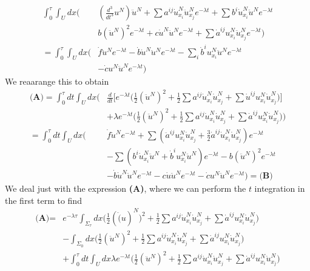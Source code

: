 \documentclass[12pt,a4paper]{report}
\newenvironment{proof}
{\begin{changemargin}{1cm}{0.5cm} 
	}%
	{\end{changemargin}
}
\begin{document}
\begin{proof}
\begin{align*}
\int_0^{\tau}\int_U dx \Big(& (\frac{d^3}{dt^3}u^N)\ddot{u}^N + \sum a^{ij}\dot{u}_{x_i}^N \ddot{u}_{x_j}^N e^{-\lambda t} + \sum b^i \dot{u}_{x_i}^N \ddot{u}^N e^{-\lambda t} \\
& b (\ddot{u}^N)^2 e^{-\lambda t} + c\dot{u}^N \ddot{u}^N e^{-\lambda t} + \sum \dot{a}^{ij}u^N_{x_i}\ddot{u}^N_{x_j} e^{-\lambda t} \Big) \\
=\int_0^{\tau} \int_U dx \Big( &\dot{f}\ddot{u}^N e^{-\lambda t} - \dot{b}\dot{u}^N \ddot{u}^N e^{-\lambda t} - \sum_i \dot{b}^i u_{x_i}^N \ddot{u}^N e^{-\lambda t} \\
& - \dot{c}u^N \ddot{u}^N e^{-\lambda t}\Big)
\end{align*}
We reaarange this to obtain
\begin{align*}
\textbf{(A)} = \int_0^{\tau}dt \int_U dx \Big(& \frac{d}{dt}\Big[ e^{-\lambda t}\Big( \frac{1}{2}(\ddot{u}^N)^2 + \frac{1}{2} \sum a^{ij} \dot{u}_{x_i}^N \dot{u}_{x_j}^N + \sum \dot{u}^{ij}u^N_{x_i}\dot{u}^N_{x_j} \Big) \Big] \\
& + \lambda e^{-\lambda t}\Big( \frac{1}{2}(\ddot{u}^N)^2 + \frac{1}{2}\sum a^{ij}\dot{u}^N_{x_i} \dot{u}^N_{x_j} + \sum \dot{a}^{ij}u^N_{x_i}\dot{u}^N_{x_j} \Big)  \Big) \\
= \int_0^{\tau}dt \int_U dx \Big( & \dot{f} \ddot{u}^N e^{-\lambda t} + \sum (\ddot{a}^{ij}u^N_{x_i}\dot{u}^N_{x_j} + \frac{3}{2}\dot{a}^{ij} \dot{u}^N_{x_i} \dot{u}^N_{x_j})e^{-\lambda t} \\
& -\sum (b^i \dot{u}^N_{x_i}\ddot{u}^N + \dot{b}^i u^N_{x_i}\ddot{u}^N)e^{-\lambda t} - b(\ddot{u}^N)^2 e^{-\lambda t} \\
& - \dot{b} \dot{u}^N \ddot{u}^N e^{-\lambda t} - c\dot{u}\ddot{u}^N e^{-\lambda t} - \dot{c}u^N \ddot{u}^N e^{-\lambda t} \Big) = \textbf{(B)}
\end{align*}
We deal just with the expression \textbf{(A)}, where we can perform the $t$ integration in the first term to find
\begin{align*}
\textbf{(A)}= & e^{-\lambda \tau} \int_{\Sigma_{\tau}} dx\Big( \frac{1}{2}(\ddot(u)^N)^2 + \frac{1}{2}\sum a^{ij}\dot{u}^N_{x_i} \dot{u}^N_{x_j} + \sum \dot{a}^{ij} u^N_{x_i} \dot{u}^N_{x_j}  \Big) \\
& - \int_{\Sigma_0} dx \Big( \frac{1}{2} (\ddot{u}^N)^2 + \frac{1}{2} \sum a^{ij} \dot{u}^N_{x_i} \dot{u}^N_{x_j} + \sum \dot{a}^{ij} u^N_{x_i} \dot{u}^N_{x_j} \Big)\\
& + \int_0^{\tau} dt \int_U dx \lambda e^{-\lambda t} \Big( \frac{1}{2}(\ddot{u}^N)^2 + \frac{1}{2}\sum a^{ij}\dot{u}^N_{x_i} \dot{u}^N_{x_j} + \sum \dot{a}^{ij} u_{x_i}^N \dot{u}_{x_j}^N \Big)

\end{align*}
\end{proof}
\end{document}
